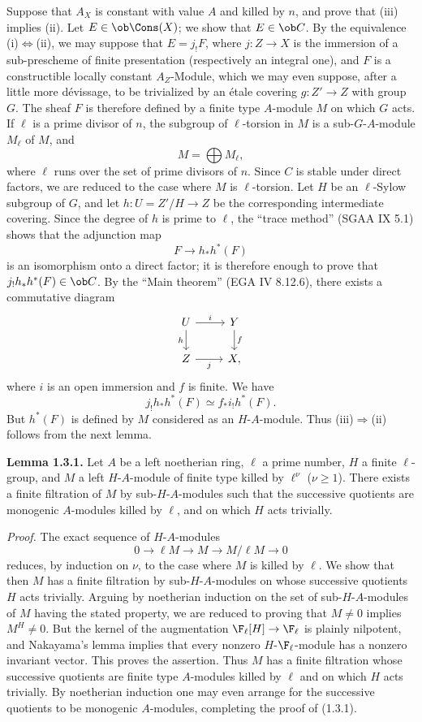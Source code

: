Suppose that $A_X$ is constant with value $A$ and killed by $n$, and prove that (iii) implies (ii). Let $E\in\ob\Cons(X)$; we show that $E\in\ob C$. By the equivalence (i)$\Leftrightarrow$(ii), we may suppose that $E=j_!F$, where $j:Z\to X$ is the immersion of a sub-prescheme of finite presentation (respectively an integral one), and $F$ is a constructible locally constant $A_Z$-Module, which we may even suppose, after a little more dévissage, to be trivialized by an étale covering $g:Z'\to Z$ with group $G$. The sheaf $F$ is therefore defined by a finite type $A$-module $M$ on which $G$ acts. If $\ell$ is a prime divisor of $n$, the subgroup of $\ell$-torsion in $M$ is a sub-$G$-$A$-module $M_\ell$ of $M$, and
\[
        M=\bigoplus M_\ell,
\]
where $\ell$ runs over the set of prime divisors of $n$. Since $C$ is stable under direct factors, we are reduced to the case where $M$ is $\ell$-torsion. Let $H$ be an $\ell$-Sylow subgroup of $G$, and let $h:U=Z'/H\to Z$ be the corresponding intermediate covering. Since the degree of $h$ is prime to $\ell$, the ``trace method'' (SGAA IX 5.1) shows that the adjunction map
\[
        F\longrightarrow h_*h^*(F)
\]
is an isomorphism onto a direct factor; it is therefore enough to prove that $j_!h_*h^*(F)\in\ob C$. By the ``Main theorem'' (EGA IV 8.12.6), there exists a commutative diagram
\[
\begin{tikzcd}
U \arrow[r,"i"] \arrow[d,"h"'] & Y \arrow[d,"f"]\\
Z \arrow[r,"j"'] & X,
\end{tikzcd}
\]
where $i$ is an open immersion and $f$ is finite. We have
\[
        j_!h_*h^*(F) \simeq f_* i_! h^*(F).
\]
But $h^*(F)$ is defined by $M$ considered as an $H$-$A$-module. Thus (iii)$\Rightarrow$(ii) follows from the next lemma.

\textbf{Lemma 1.3.1.} Let $A$ be a left noetherian ring, $\ell$ a prime number, $H$ a finite $\ell$-group, and $M$ a left $H$-$A$-module of finite type killed by $\ell^\nu$ ($\nu\geq1$). There exists a finite filtration of $M$ by sub-$H$-$A$-modules such that the successive quotients are monogenic $A$-modules killed by $\ell$, and on which $H$ acts trivially.

\emph{Proof.} The exact sequence of $H$-$A$-modules
\[
        0\longrightarrow \ell M\longrightarrow M\longrightarrow M/\ell M\longrightarrow 0
\]
reduces, by induction on $\nu$, to the case where $M$ is killed by $\ell$. We show that then $M$ has a finite filtration by sub-$H$-$A$-modules on whose successive quotients $H$ acts trivially. Arguing by noetherian induction on the set of sub-$H$-$A$-modules of $M$ having the stated property, we are reduced to proving that $M\neq0$ implies $M^H\neq0$. But the kernel of the augmentation $\F_\ell[H]\to\F_\ell$ is plainly nilpotent, and Nakayama's lemma implies that every nonzero $H$-$\F_\ell$-module has a nonzero invariant vector. This proves the assertion. Thus $M$ has a finite filtration whose successive quotients are finite type $A$-modules killed by $\ell$ and on which $H$ acts trivially. By noetherian induction one may even arrange for the successive quotients to be monogenic $A$-modules, completing the proof of (1.3.1).

